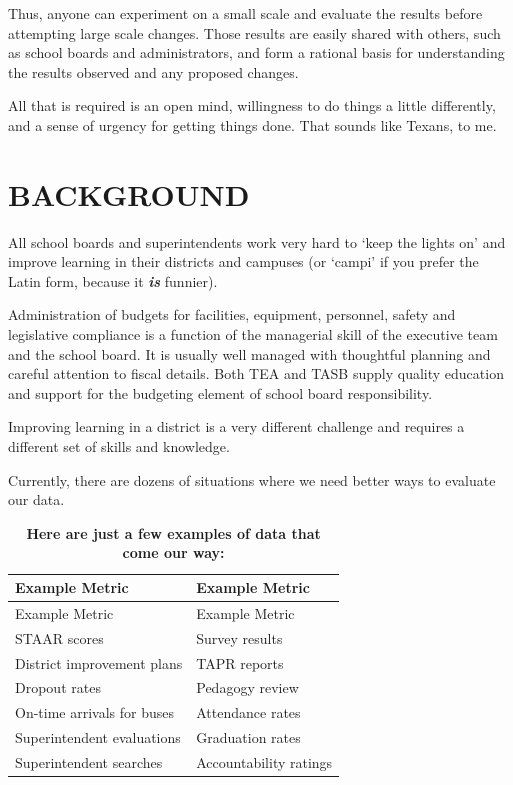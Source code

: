 \documentclass[
  letterpaper,
  DIV=11,
  numbers=noendperiod]{scrartcl}
\begin{document}
Thus, anyone can experiment on a small scale and evaluate the results
before attempting large scale changes. Those results are easily shared
with others, such as school boards and administrators, and form a
rational basis for understanding the results observed and any proposed
changes.

All that is required is an open mind, willingness to do things a little
differently, and a sense of urgency for getting things done. That sounds
like Texans, to me.

\vspace{0.3in}

\section{\texorpdfstring{\textbf{BACKGROUND}}{BACKGROUND}}\label{background}

All school boards and superintendents work very hard to `keep the lights
on' and improve learning in their districts and campuses (or `campi' if
you prefer the Latin form, because it \textbf{\emph{is}} funnier).

Administration of budgets for facilities, equipment, personnel, safety
and legislative compliance is a function of the managerial skill of the
executive team and the school board. It is usually well managed with
thoughtful planning and careful attention to fiscal details. Both TEA
and TASB supply quality education and support for the budgeting element
of school board responsibility.

Improving learning in a district is a very different challenge and
requires a different set of skills and knowledge.

Currently, there are dozens of situations where we need better ways to
evaluate our data.

\begin{longtable}[]{@{}ll@{}}
\caption{{\textbf{Here are just a few examples of data that come our
way:}}}\tabularnewline
\toprule\noalign{}
Example Metric & Example Metric \\
\midrule\noalign{}
\endfirsthead
\toprule\noalign{}
Example Metric & Example Metric \\
\midrule\noalign{}
\endhead
\bottomrule\noalign{}
\endlastfoot
STAAR scores & Survey results \\
District improvement plans & TAPR reports \\
Dropout rates & Pedagogy review \\
On-time arrivals for buses & Attendance rates \\
Superintendent evaluations & Graduation rates \\
Superintendent searches & Accountability ratings \\
\end{longtable}
\end{document}
